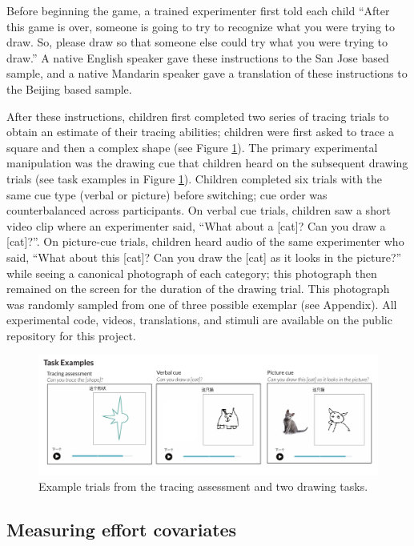 \documentclass[
  english,
  man]{apa6}
\begin{document}
Before beginning the game, a trained experimenter first told each child \enquote{After this game is over, someone is going to try to recognize what you were trying to draw. So, please draw so that someone else could try what you were trying to draw.} A native English speaker gave these instructions to the San Jose based sample, and a native Mandarin speaker gave a translation of these instructions to the Beijing based sample.

After these instructions, children first completed two series of tracing trials to obtain an estimate of their tracing abilities; children were first asked to trace a square and then a complex shape (see Figure \ref{fig:example-tasks}). The primary experimental manipulation was the drawing cue that children heard on the subsequent drawing trials (see task examples in Figure \ref{fig:example-tasks}). Children completed six trials with the same cue type (verbal or picture) before switching; cue order was counterbalanced across participants. On verbal cue trials, children saw a short video clip where an experimenter said, \enquote{What about a {[}cat{]}? Can you draw a {[}cat{]}?}. On picture-cue trials, children heard audio of the same experimenter who said, \enquote{What about this {[}cat{]}? Can you draw the {[}cat{]} as it looks in the picture?} while seeing a canonical photograph of each category; this photograph then remained on the screen for the duration of the drawing trial. This photograph was randomly sampled from one of three possible exemplar (see Appendix). All experimental code, videos, translations, and stimuli are available on the public repository for this project.

\begin{figure}[H]
\includegraphics[width=1\linewidth]{figs/task_examples} \caption{Example trials from the tracing assessment and two drawing tasks.}\label{fig:example-tasks}
\end{figure}

\hypertarget{measuring-effort-covariates}{%
\subsection{Measuring effort covariates}\label{measuring-effort-covariates}}
\end{document}
